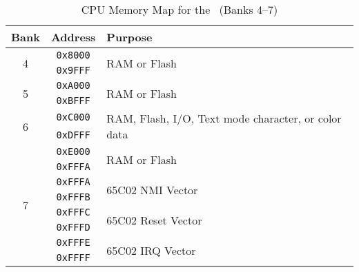 \begin{table}[ht]
    \begin{center}
        \begin{tabular}{|c|c|l|} \hline
            Bank & Address & Purpose \\ \hline\hline
            \multirow{2}{*}{4} & \verb+0x8000+ & \multirow{2}{*}{RAM or Flash} \\ \cline{2-2}
            & \verb+0x9FFF+ & \\ \hline
            \multirow{2}{*}{5} & \verb+0xA000+ & \multirow{2}{*}{RAM or Flash} \\ \cline{2-2}
            & \verb+0xBFFF+ & \\ \hline
            \multirow{2}{*}{6} & \verb+0xC000+ & \multirow{2}{*}{RAM, Flash, I/O, Text mode character, or color data} \\ \cline{2-2}
            & \verb+0xDFFF+ & \\ \hline
            \multirow{8}{*}{7} & \verb+0xE000+ & \multirow{2}{*}{RAM or Flash} \\ \cline{2-2}
            & \verb+0xFFFA+ & \\ \cline{2-3}
            & \verb+0xFFFA+ & \multirow{2}{*}{65C02 NMI Vector} \\ \cline{2-2}
            &\verb+0xFFFB+ & \\ \cline{2-3}
            &\verb+0xFFFC+ & \multirow{2}{*}{65C02 Reset Vector} \\ \cline{2-2}
            &\verb+0xFFFD+ & \\ \cline{2-3}
            &\verb+0xFFFE+ & \multirow{2}{*}{65C02 IRQ Vector} \\ \cline{2-2}
            &\verb+0xFFFF+ & \\ \hline
        \end{tabular}
    \end{center}
    \caption{CPU Memory Map for the \jr\ (Banks 4--7)}
    \label{tab:cpu_mem_map_4_7}
\end{table}



